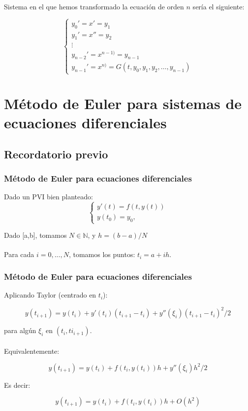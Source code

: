 \documentclass{beamer}
\begin{document}
\begin{frame}
	
	Sistema en el que hemos transformado la ecuación de orden $n$ sería el siguiente:
	
	$$
	\begin{cases}
	y_0' = x' = y_1\\
	y_1' = x'' = y_2\\
	\vdots\\
	y_{n-2}' = x^{n-1)} = y_{n-1}\\
	y_{n-1}' = x^{n)} = G(t,y_0, y_1, y_2, \dots, y_{n-1})
	\end{cases}
	$$
	
\end{frame}

\section{Método de Euler para sistemas de ecuaciones diferenciales}
\subsection{Recordatorio previo}
\begin{frame}
	\frametitle{Método de Euler para ecuaciones diferenciales}
	
	Dado un PVI bien planteado:
	$$
	\begin{cases}
	y'(t)=f(t,y(t)) \\ 
	y(t_0)=y_0, 
	\end{cases}
	$$
	
	Dado [a,b], tomamos $N \in \mathbb{N}$, y $h=(b-a)/N$\\~\\
	Para cada $i=0,...,N$, tomamos los puntos: $t_i=a+ih$.
	
\end{frame}

\begin{frame}
	\frametitle{Método de Euler para ecuaciones diferenciales}
	Aplicando Taylor (centrado en $t_i$):

	$$y(t_{i+1})=y(t_i) + y'(t_i)(t_{i+1}-t_i) + y''(\xi_i)(t_{i+1}-t_i)^2/2$$ 

	para algún $\xi_i$ en $(t_i, ti_{i+1})$.\\~\\
	
	Equivalentemente:
	
	$$y(t_{i+1})=y(t_i) + f(t_i,y(t_i))h + y''(\xi_i)h^2/2$$
	
	Es decir: 
	
	$$y(t_{i+1})=y(t_i) + f(t_i,y(t_i))h + O(h^2)$$ 
	
\end{frame}
\end{document}

